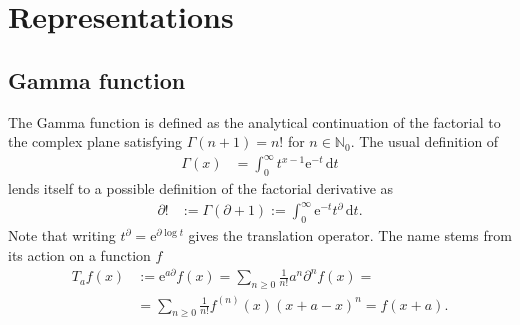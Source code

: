 \documentclass[english, parskip=full]{scrartcl}
\newcommand{\intx}{}
\newcommand{\kla}{}
\newcommand{\e}{\text{e}}
\begin{document}
\section{Representations}
\subsection{Gamma function}
The Gamma function is defined as the analytical continuation of the factorial to the complex plane satisfying $\Gamma(n+1) = n!$ for $n\in\mathbb{N}_0$.
The usual definition of 
\begin{align}
\Gamma(x) &= \intx\int_{0}^{\infty} t^{x-1} \e^{-t} \, \mathrm{d}t
\end{align}
lends itself to a possible definition of the factorial derivative as
\begin{align}
\partial! &:= \Gamma\kla\left( \partial + 1 \right) := \int_{0}^{\infty} \e^{-t} t^\partial \, \mathrm{d}t.
\end{align}
Note that writing $t^\partial = \e^{\partial \log t}$ gives the translation operator.
The name stems from its action on a function $f$
\begin{align}
T_a f(x) &:= \e^{a \partial} f(x) = \sum_{n\ge 0} \frac{1}{n!} a^n \partial^n f(x) = \\
&= \sum_{n\ge 0} \frac{1}{n!} f^{(n)}(x) (x+a - x)^n = f(x+a).
\end{align}
\end{document}
